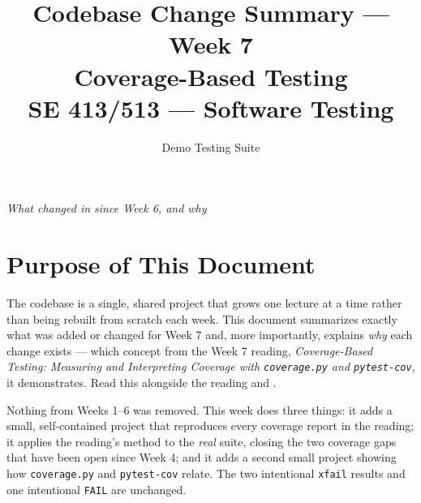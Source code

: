\documentclass[11pt]{article}
\title{
  \textbf{Codebase Change Summary --- Week 7}\\[4pt]
  \large Coverage-Based Testing\\[2pt]
  \normalsize SE 413/513 --- Software Testing
}
\author{Demo Testing Suite}
\date{}
\begin{document}
\maketitle

\begin{center}
\textit{What changed in  since Week 6, and why}
\end{center}

\vspace{0.3cm}

\section{Purpose of This Document}
The  codebase is a single, shared project that
grows one lecture at a time rather than being rebuilt from scratch each
week. This document summarizes exactly what was added or changed for
Week 7 and, more importantly, explains \emph{why} each change exists ---
which concept from the Week 7 reading, \textit{Coverage-Based Testing:
Measuring and Interpreting Coverage with \texttt{coverage.py} and
\texttt{pytest-cov}}, it demonstrates. Read this alongside the reading
and .

\begin{keyidea}
Nothing from Weeks 1--6 was removed. This week does three things: it
adds a small, self-contained project that reproduces every coverage
report in the reading; it applies the reading's method to the
\emph{real} suite, closing the two coverage gaps that have been open
since Week 4; and it adds a second small project showing how
\texttt{coverage.py} and \texttt{pytest-cov} relate. The two intentional \texttt{xfail} results and one
intentional \texttt{FAIL} are unchanged.
\end{keyidea}

\end{document}
